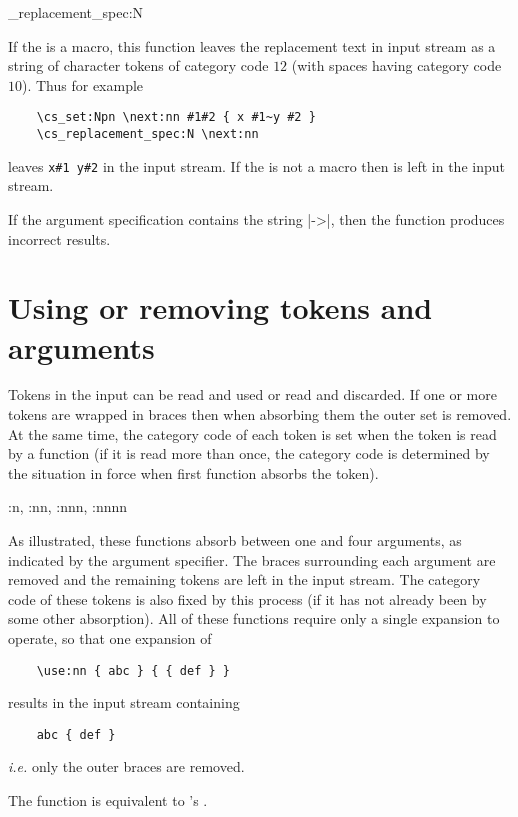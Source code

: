 \documentclass[uplatex,dvipdfmx,full,kernel]{wtpl3doc}
\begin{document}
\begin{documentation}
\begin{function}[EXP, added = 2019-02-27]{\cs_replacement_spec:N}
  \begin{syntax}
     
  \end{syntax}
  If the  is a macro, this function leaves the replacement
  text in input stream as a string of character tokens of category
  code $12$ (with spaces having category code $10$). Thus for example
  \begin{verbatim}
    \cs_set:Npn \next:nn #1#2 { x #1~y #2 }
    \cs_replacement_spec:N \next:nn
  \end{verbatim}
  leaves \verb*|x#1 y#2| in the input stream. If the  is
  not a macro then  is left in the input stream.
  \begin{texnote}
    If the argument specification contains the string |->|, then the
    function produces incorrect results.
  \end{texnote}
\end{function}

\section{Using or removing tokens and arguments}

Tokens in the input can be read and used or read and discarded.
If one or more tokens are wrapped in braces then when absorbing them
the outer set is removed. At the same time, the category code
of each token is set when the token is read by a function (if it
is read more than once, the category code is determined by
the situation in force when first function absorbs the token).

\begin{function}[EXP]{\use:n, \use:nn, \use:nnn, \use:nnnn}
  \begin{syntax}
        
        
        
        
  \end{syntax}
  As illustrated, these functions absorb between one and four
  arguments, as indicated by the argument specifier. The braces
  surrounding each argument are removed and the remaining tokens are
  left in the input stream. The category code of these tokens is
  also fixed by this process (if it has not already been by some
  other absorption). All of these functions require only a single
  expansion to operate, so that one expansion of
  \begin{verbatim}
    \use:nn { abc } { { def } }
  \end{verbatim}
  results in the input stream containing
  \begin{verbatim}
    abc { def }
  \end{verbatim}
  \emph{i.e.} only the outer braces are removed.
  \begin{texnote}
    The  function is equivalent to \LaTeXe{}'s .
  \end{texnote}
\end{function}


\end{documentation}
\end{document}
